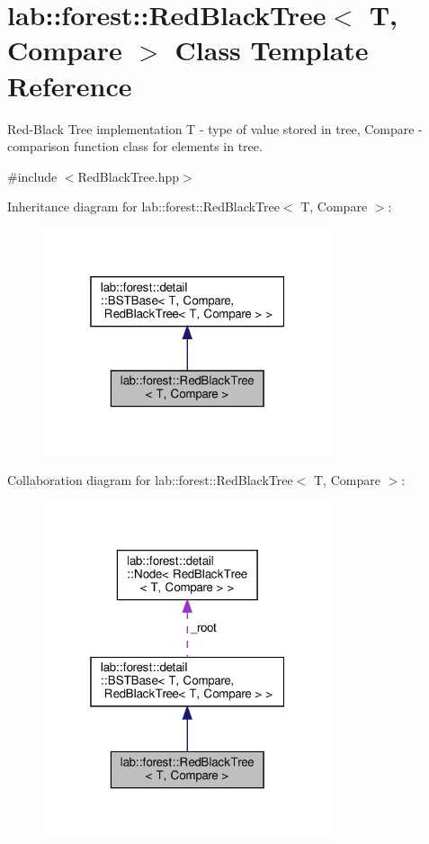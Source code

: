 \hypertarget{classlab_1_1forest_1_1RedBlackTree}{}\section{lab\+:\+:forest\+:\+:Red\+Black\+Tree$<$ T, Compare $>$ Class Template Reference}
\label{classlab_1_1forest_1_1RedBlackTree}


Red-\/\+Black Tree implementation T -\/ type of value stored in tree, Compare -\/ comparison function class for elements in tree.  




{\ttfamily \#include $<$Red\+Black\+Tree.\+hpp$>$}



Inheritance diagram for lab\+:\+:forest\+:\+:Red\+Black\+Tree$<$ T, Compare $>$\+:
\nopagebreak
\begin{figure}[H]
\begin{center}
\leavevmode
\includegraphics[width=241pt]{classlab_1_1forest_1_1RedBlackTree__inherit__graph}
\end{center}
\end{figure}


Collaboration diagram for lab\+:\+:forest\+:\+:Red\+Black\+Tree$<$ T, Compare $>$\+:
\nopagebreak
\begin{figure}[H]
\begin{center}
\leavevmode
\includegraphics[width=241pt]{classlab_1_1forest_1_1RedBlackTree__coll__graph}
\end{center}
\end{figure}
